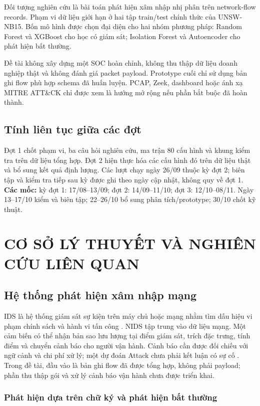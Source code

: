 \documentclass[12pt,a4paper,oneside]{report}
\begin{document}
Đối tượng nghiên cứu là bài toán phát hiện xâm nhập nhị phân trên network-flow records. Phạm vi dữ liệu giới hạn ở hai tập train/test chính thức của UNSW-NB15. Bốn mô hình được chọn đại diện cho hai nhóm phương pháp: Random Forest và XGBoost cho học có giám sát; Isolation Forest và Autoencoder cho phát hiện bất thường.

Đề tài không xây dựng một SOC hoàn chỉnh, không thu thập dữ liệu doanh nghiệp thật và không đánh giá packet payload. Prototype cuối chỉ sử dụng bản ghi flow phù hợp schema đã huấn luyện. PCAP, Zeek, dashboard hoặc ánh xạ MITRE ATT\&CK chỉ được xem là hướng mở rộng nếu phần bắt buộc đã hoàn thành.


\section{Tính liên tục giữa các đợt}
Đợt 1 chốt phạm vi, ba câu hỏi nghiên cứu, ma trận 80 cấu hình và khung kiểm tra trên dữ liệu tổng hợp. Đợt 2 hiện thực hóa các cấu hình đó trên dữ liệu thật và bổ sung kết quả định lượng. Các lượt chạy ngày 26/09 thuộc kỳ đợt 2; biên tập và kiểm tra tiếp sau kỳ được ghi theo ngày cập nhật, không quy về đợt 1.
\noindent\textbf{Các mốc:} kỳ đợt 1: 17/08--13/09; đợt 2: 14/09--11/10; đợt 3: 12/10--08/11. Ngày 13--17/10 kiểm và biên tập; 22--26/10 bổ sung phân tích/prototype; 30/10 chốt kỹ thuật.

\chapter{CƠ SỞ LÝ THUYẾT VÀ NGHIÊN CỨU LIÊN QUAN}

\section{Hệ thống phát hiện xâm nhập mạng}

IDS là hệ thống giám sát sự kiện trên máy chủ hoặc mạng nhằm tìm dấu hiệu vi phạm chính sách và hành vi tấn công \cite{nist80094}. NIDS tập trung vào dữ liệu mạng. Một cảm biến có thể nhận bản sao lưu lượng tại điểm giám sát, trích đặc trưng, tính điểm và chuyển cảnh báo cho người vận hành. Cảnh báo cần được đối chiếu với ngữ cảnh và chi phí xử lý; một dự đoán Attack chưa phải kết luận có sự cố \cite{nist80094,sommer2010}. Trong đề tài, đầu vào là bản ghi flow đã được tổng hợp, không phải payload; phần thu thập gói và xử lý cảnh báo vận hành chưa được triển khai.

\subsection{Phát hiện dựa trên chữ ký và phát hiện bất thường}
\end{document}
